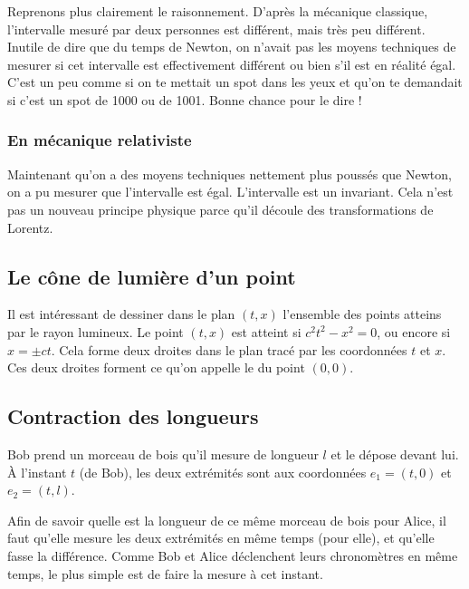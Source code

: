 Reprenons plus clairement le raisonnement. D'après la mécanique classique, l'intervalle mesuré par deux personnes est différent, mais très peu différent. Inutile de dire que du temps de Newton, on n'avait pas les moyens techniques de mesurer si cet intervalle est effectivement différent ou bien s'il est en réalité égal. C'est un peu comme si on te mettait un spot dans les yeux et qu'on te demandait si c'est un spot de \unit{1000}{\watt} ou de \unit{1001}{\watt}. Bonne chance pour le dire !

\subsubsection{En mécanique relativiste}

 Maintenant qu'on a des moyens techniques nettement plus poussés que Newton, on a pu mesurer que l'intervalle est égal. L'intervalle est un invariant. Cela n'est pas un nouveau principe physique parce qu'il découle des transformations de Lorentz.


\subsection{Le cône de lumière d'un point}


Il est intéressant de dessiner dans le plan $(t,x)$ l'ensemble des points atteins par le rayon lumineux. Le point $(t,x)$ est atteint si $c^2t^2-x^2=0$, ou encore si $x=\pm ct$. Cela forme deux droites dans le plan tracé par les coordonnées $t$ et $x$. Ces deux droites forment ce qu'on appelle le  du point $(0,0)$.

\subsection{Contraction des longueurs}

Bob prend un morceau de bois qu'il mesure de longueur $l$ et le dépose devant lui. À l'instant $t$ (de Bob), les deux extrémités sont aux coordonnées $e_1=(t,0)$ et $e_2=(t,l)$. 

Afin de savoir quelle est la longueur de ce même morceau de bois pour Alice, il faut qu'elle mesure les deux extrémités en même temps (pour elle), et qu'elle fasse la différence. Comme Bob et Alice déclenchent leurs chronomètres en même temps, le plus simple est de faire la mesure à cet instant.


